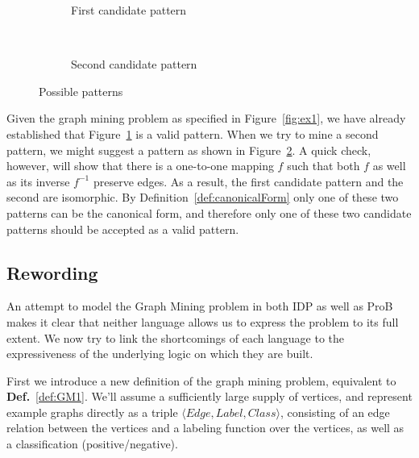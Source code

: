 \documentclass{article}
\theoremstyle{definition}
\newcommand{\triple}[1]{\ensuremath{\langle #1 \rangle}}
\begin{document}
\begin{figure}[h]
  \centering
  \begin{subfigure}[b]{0.45\textwidth}
    \centering
    \caption{First candidate pattern\label{fig:iso1}}
  \end{subfigure}
  ~
  \begin{subfigure}[b]{0.45\textwidth}
    \centering
    \caption{Second candidate pattern\label{fig:iso2}}
  \end{subfigure}
  \caption{Possible patterns\label{fig:isomorphism}}
\end{figure}

Given the graph mining problem as specified in Figure~\ref{fig:ex1}, we have already established that Figure~\ref{fig:iso1} is a valid pattern.
When we try to mine a second pattern, we might suggest a pattern as shown in Figure~\ref{fig:iso2}.
A quick check, however, will show that there is a one-to-one mapping $f$ such that both $f$ as well as its inverse $f^{-1}$ preserve edges.
As a result, the first candidate pattern and the second are isomorphic.
By Definition~\ref{def:canonicalForm} only one of these two patterns can be the canonical form, and therefore only one of these two candidate patterns should be accepted as a valid pattern.

\subsection{Rewording}

An attempt to model the Graph Mining problem in both IDP as well as ProB makes it clear
that neither language allows us to express the problem to its full extent.
We now try to link the shortcomings of each language to the expressiveness of the underlying logic on which they are built.

First we introduce a new definition of the graph mining problem, equivalent to \textbf{Def.}~\ref{def:GM1}.
We'll assume a sufficiently large supply of vertices, and represent example graphs directly as a triple $\triple{Edge, Label, Class}$, consisting of an edge relation between the vertices and a labeling function over the vertices, as well as a classification (positive/negative).
\end{document}
